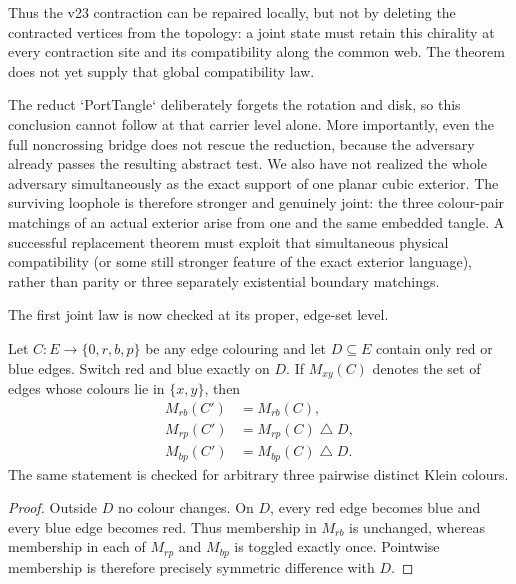 Thus the v23 contraction can be repaired locally, but not by deleting the
contracted vertices from the topology: a joint state must retain this
chirality at every contraction site and its compatibility along the common
web.  The theorem does not yet supply that global compatibility law.

The reduct `PortTangle` deliberately forgets the rotation and disk, so this
conclusion cannot follow at that carrier level alone.  More importantly, even
the full noncrossing bridge does not rescue the reduction, because the
adversary already passes the resulting abstract test.  We also have not
realized the whole adversary simultaneously as the exact support of one
planar cubic exterior.  The surviving loophole is therefore stronger and
genuinely joint: the three colour-pair matchings of an actual exterior arise
from one and the same embedded tangle.  A successful replacement theorem
must exploit that simultaneous physical compatibility (or some still
stronger feature of the exact exterior language), rather than parity or
three separately existential boundary matchings.

The first joint law is now checked at its proper, edge-set level.

\begin{theorem}
\label{thm:kempe-idemposition-identity}
Let $C:E\to\{0,r,b,p\}$ be any edge colouring and let $D\subseteq E$
contain only red or blue edges.  Switch red and blue exactly on $D$.  If
$M_{xy}(C)$ denotes the set of edges whose colours lie in
$\{x,y\}$, then
\[
 \begin{aligned}
 M_{rb}(C')&=M_{rb}(C),\\
 M_{rp}(C')&=M_{rp}(C)\mathbin\triangle D,\\
 M_{bp}(C')&=M_{bp}(C)\mathbin\triangle D.
 \end{aligned}
\]
The same statement is checked for arbitrary three pairwise distinct Klein
colours.
\end{theorem}

\begin{proof}
Outside $D$ no colour changes.  On $D$, every red edge becomes blue and
every blue edge becomes red.  Thus membership in $M_{rb}$ is unchanged,
whereas membership in each of $M_{rp}$ and $M_{bp}$ is toggled exactly
once.  Pointwise membership is therefore precisely symmetric difference
with $D$.
\end{proof}

